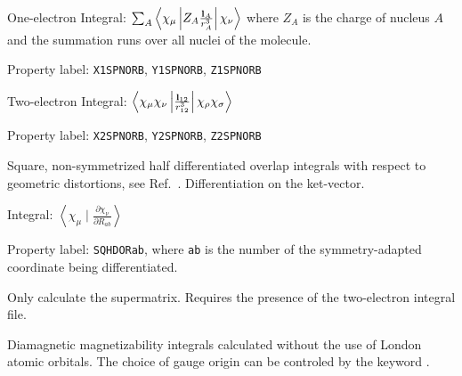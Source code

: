 \begin{description}
\begin{list}{}{}
\item One-electron Integral:
$\sum_A\left<\chi_{\mu}\left|Z_A\frac{{\bf l}_A}{r_{A}^{3}}\right|\chi_{\nu}\right>$
where $Z_A$ is the charge of nucleus $A$ and the summation runs over
all nuclei of the molecule.
\item Property label: \verb|X1SPNORB|,  \verb|Y1SPNORB|,  \verb|Z1SPNORB|
\item Two-electron Integral:
$\left<\chi_{\mu}\chi_{\nu}\left|\frac{{\bf l}_{12}}{r_{12}^{3}}\right|\chi_{\rho}\chi_{\sigma}\right>$
\item Property label: \verb|X2SPNORB|,  \verb|Y2SPNORB|,  \verb|Z2SPNORB|
\end{list}

%

\item[\Key{SQHDOR}] Square, non-symmetrized half differentiated
overlap integrals with respect to geometric distortions, see
Ref.~\cite{klbpjhjajjothjcp97}. Differentiation on the ket-vector.

\begin{list}{}{}
\item Integral: $\left<\chi_{\mu}\mid\frac{\partial\chi_{\nu}}{\partial
R_{ab}}\right>$
\item Property label: \verb|SQHDORab|, where \verb|ab| is the number
of the symmetry-adapted coordinate being differentiated.
\end{list}

\item[\Key{SUPONL}] Only calculate the supermatrix. Requires the
presence of the two-electron integral file.

\item[\Key{SUSCGO}] Diamagnetic magnetizability integrals calculated
without the use of London atomic orbitals. The choice of gauge
origin
can be controled by the keyword .


\end{description}
